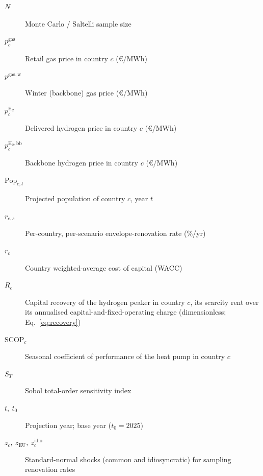 \documentclass[review]{elsarticle}
\begin{document}
\begin{description}
 \item[$N$] Monte Carlo / Saltelli sample size
 \item[$p^{\mathrm{gas}}_{c}$] Retail gas price in country $c$ (\euro{}/MWh)
 \item[$p^{\mathrm{gas,w}}$] Winter (backbone) gas price (\euro{}/MWh)
 \item[$p^{\mathrm{H_2}}_{c}$] Delivered hydrogen price in country $c$ (\euro{}/MWh)
 \item[$p^{\mathrm{H_2,bb}}_{c}$] Backbone hydrogen price in country $c$ (\euro{}/MWh)
 \item[$\mathrm{Pop}_{c,t}$] Projected population of country $c$, year $t$
 \item[$r_{c,s}$] Per-country, per-scenario envelope-renovation rate (\%/yr)
 \item[$r_{c}$] Country weighted-average cost of capital (WACC)
 \item[$R_{c}$] Capital recovery of the hydrogen peaker in country $c$, its scarcity rent
over its annualised capital-and-fixed-operating charge (dimensionless;
Eq.~\eqref{eq:recovery})
 \item[$\mathrm{SCOP}_{c}$] Seasonal coefficient of performance of the heat pump in country $c$
 \item[$S_{T}$] Sobol total-order sensitivity index
 \item[$t,\ t_{0}$] Projection year; base year ($t_{0}=2025$)
 \item[$z_{c},\ z_{\mathrm{EU}},\ z_{c}^{\mathrm{idio}}$] Standard-normal shocks (common and idiosyncratic) for sampling renovation rates
\end{description}
\end{document}

